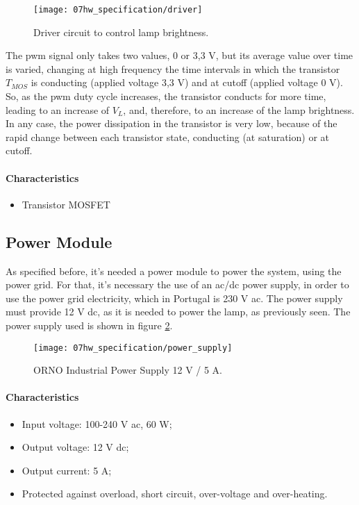 \begin{figure}[H]
	\centering
	\texttt{[image: 07hw\_specification/driver]}
	\caption{Driver circuit to control lamp brightness.}
	\label{fig:driver}
\end{figure}

The \ac{pwm} signal only takes two values, 0 or 3,3 V, but its average value over time is varied, changing at high frequency the time intervals in which the transistor \(T_{MOS}\) is conducting (applied voltage 3,3 V) and at cutoff (applied voltage 0 V). So, as the \ac{pwm} duty cycle increases, the transistor conducts for more time, leading to an increase of \(V_{L}\), and, therefore, to an increase of the lamp brightness. In any case, the power dissipation in the transistor is very low, because of the rapid change between each transistor state, conducting (at saturation) or at cutoff.

\paragraph*{Characteristics}
\begin{itemize}
	\item Transistor MOSFET
\end{itemize}


\subsection{Power Module}
As specified before, it's needed a power module to power the system, using the power grid. For that, it's necessary the use of an \ac{ac}/\ac{dc} power supply, in order to use the power grid electricity, which in Portugal is 230 V \ac{ac}. The power supply must provide 12 V \ac{dc}, as it is needed to power the lamp, as previously seen. The power supply used is shown in figure \ref{fig:power_supply}. \cite{power_supply}

\begin{figure}[H]
	\centering
	\texttt{[image: 07hw\_specification/power\_supply]}
	\caption{ORNO Industrial Power Supply 12 V / 5 A.}
	\label{fig:power_supply}
\end{figure}

\paragraph*{Characteristics}
\begin{itemize}
	\item Input voltage: 100-240 V \ac{ac}, 60 W;
	\item Output voltage: 12 V \ac{dc};
	\item Output current: 5 A;
	\item Protected against overload, short circuit, over-voltage and over-heating.
\end{itemize}

